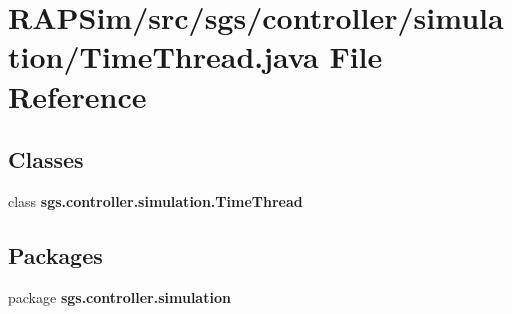 \section{R\-A\-P\-Sim/src/sgs/controller/simulation/\-Time\-Thread.java File Reference}
\label{_time_thread_8java}
\subsection*{Classes}
\begin{DoxyCompactItemize}
\item 
class {\bf sgs.\-controller.\-simulation.\-Time\-Thread}
\end{DoxyCompactItemize}
\subsection*{Packages}
\begin{DoxyCompactItemize}
\item 
package {\bf sgs.\-controller.\-simulation}
\end{DoxyCompactItemize}

